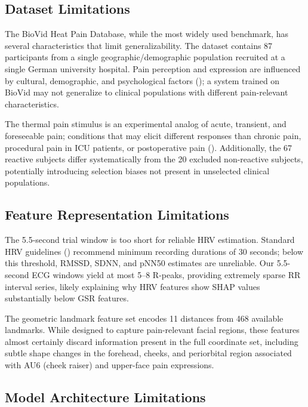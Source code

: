 \documentclass[10pt, twocolumn]{article}
\begin{document}
\subsection{Dataset Limitations}

The BioVid Heat Pain Database, while the most widely used benchmark, has several
characteristics that limit generalizability. The dataset contains 87 participants from a
single geographic/demographic population recruited at a single German university hospital.
Pain perception and expression are influenced by cultural, demographic, and psychological
factors (\cite{Turk2010}); a system trained on BioVid may not generalize to clinical
populations with different pain-relevant characteristics.

The thermal pain stimulus is an experimental analog of acute, transient, and foreseeable
pain; conditions that may elicit different responses than chronic pain, procedural pain in
ICU patients, or postoperative pain (\cite{Lichtner2014}). Additionally, the 67 reactive
subjects differ systematically from the 20 excluded non-reactive subjects, potentially
introducing selection biases not present in unselected clinical populations.

\subsection{Feature Representation Limitations}

The 5.5-second trial window is too short for reliable HRV estimation. Standard HRV
guidelines (\cite{Task1996}) recommend minimum recording durations of 30 seconds; below
this threshold, RMSSD, SDNN, and pNN50 estimates are unreliable. Our 5.5-second ECG
windows yield at most 5--8 R-peaks, providing extremely sparse RR interval series,
likely explaining why HRV features show SHAP values substantially below GSR features.

The geometric landmark feature set encodes 11 distances from 468 available landmarks.
While designed to capture pain-relevant facial regions, these features almost certainly
discard information present in the full coordinate set, including subtle shape changes in
the forehead, cheeks, and periorbital region associated with AU6 (cheek raiser) and
upper-face pain expressions.

\subsection{Model Architecture Limitations}
\end{document}
